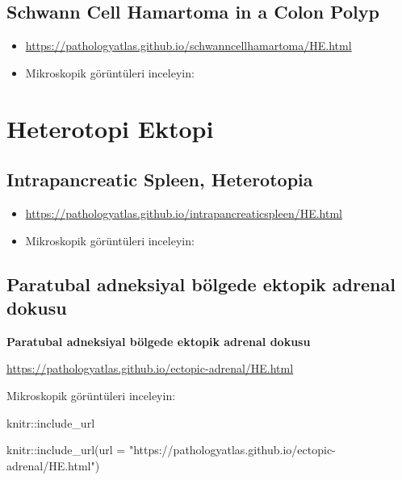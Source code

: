 \documentclass[
  letterpaper,
  DIV=11,
  numbers=noendperiod]{scrreprt}
\newenvironment{Shaded}{}{}
\newcommand{\AttributeTok}[1]{\textcolor[rgb]{0.49,0.56,0.16}{#1}}
\newcommand{\FunctionTok}[1]{\textcolor[rgb]{0.02,0.16,0.49}{#1}}
\newcommand{\NormalTok}[1]{#1}
\newcommand{\SpecialCharTok}[1]{\textcolor[rgb]{0.25,0.44,0.63}{#1}}
\newcommand{\StringTok}[1]{\textcolor[rgb]{0.25,0.44,0.63}{#1}}
\begin{document}
\hypertarget{schwann-cell-hamartoma-in-a-colon-polyp}{%
\section{Schwann Cell Hamartoma in a Colon
Polyp}\label{schwann-cell-hamartoma-in-a-colon-polyp}}

\begin{itemize}
\item
  \url{https://pathologyatlas.github.io/schwanncellhamartoma/HE.html}
\item
  Mikroskopik görüntüleri inceleyin:
\end{itemize}

\hypertarget{heterotopi-ektopi}{%
\chapter{Heterotopi Ektopi}\label{heterotopi-ektopi}}

\hypertarget{intrapancreatic-spleen-heterotopia}{%
\section{Intrapancreatic Spleen,
Heterotopia}\label{intrapancreatic-spleen-heterotopia}}

\begin{itemize}
\item
  \url{https://pathologyatlas.github.io/intrapancreaticspleen/HE.html}
\item
  Mikroskopik görüntüleri inceleyin:
\end{itemize}

\hypertarget{paratubal-adneksiyal-buxf6lgede-ektopik-adrenal-dokusu}{%
\section{Paratubal adneksiyal bölgede ektopik adrenal
dokusu}\label{paratubal-adneksiyal-buxf6lgede-ektopik-adrenal-dokusu}}

\textbf{Paratubal adneksiyal bölgede ektopik adrenal dokusu}

\url{https://pathologyatlas.github.io/ectopic-adrenal/HE.html}

Mikroskopik görüntüleri inceleyin:

knitr::include\_url

\begin{Shaded}
\begin{Highlighting}[]
\NormalTok{knitr}\SpecialCharTok{::}\FunctionTok{include\_url}\NormalTok{(}\AttributeTok{url =} \StringTok{"https://pathologyatlas.github.io/ectopic{-}adrenal/HE.html"}\NormalTok{)}
\end{Highlighting}
\end{Shaded}
\end{document}
